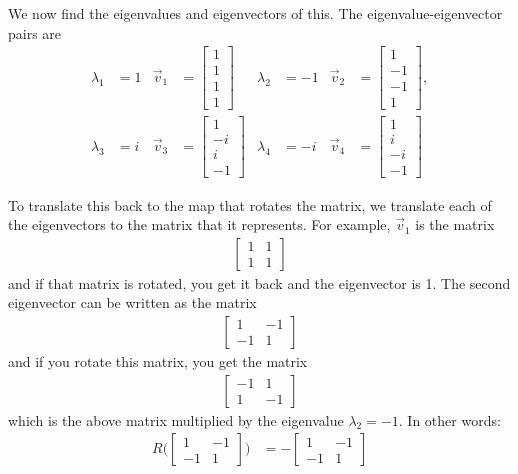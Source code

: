We now find the eigenvalues and eigenvectors of this.  The eigenvalue-ei\-gen\-vector pairs are
%
\begin{align*}
\lambda_1 & = 1 & \vec{v}_1 & = \begin{bmatrix}
1 \\ 1 \\ 1 \\1 
\end{bmatrix} & \lambda_2 & = -1 & \vec{v}_2 & = \begin{bmatrix}
1 \\ -1 \\ -1 \\ 1 
\end{bmatrix}, \\
\lambda_3 & = i & \vec{v}_3 & = \begin{bmatrix}
1 \\ -i \\ i \\ -1 
\end{bmatrix} & \lambda_4 & = -i &  \vec{v}_4 & = \begin{bmatrix}
1 \\ i \\ -i \\ -1 
\end{bmatrix}
\end{align*}

To translate this back to the map that rotates the matrix, we translate each of the eigenvectors to the matrix that it represents.  For example, $\vec{v}_1$ is the matrix 
%
\begin{align*}
\begin{bmatrix}
1 & 1 \\ 1 & 1
\end{bmatrix}
\end{align*}
and if that matrix is rotated, you get it back and the eigenvector is 1.  The second eigenvector can be written as the matrix 
%
\begin{align*}
\begin{bmatrix}
1 & -1 \\ -1 & 1 
\end{bmatrix}
\end{align*}
and if you rotate this matrix, you get the matrix %
\begin{align*}
\begin{bmatrix}
-1& 1 \\ 1 & -1 
\end{bmatrix}
\end{align*}
which is the above matrix multiplied by the eigenvalue $\lambda_2=-1$.  In other words:
%
\begin{align*}
R\biggl(
\begin{bmatrix}
1 & -1 \\ -1 & 1 
\end{bmatrix} \biggr) & = -
\begin{bmatrix}
1 & -1 \\ -1 & 1 
\end{bmatrix}
\end{align*}

